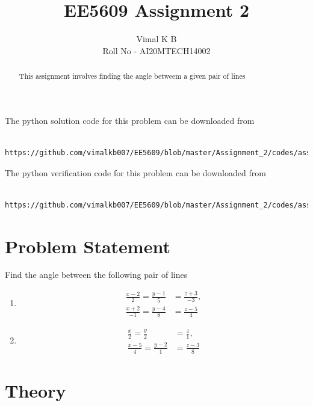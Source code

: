 \documentclass[journal,12pt,twocolumn]{IEEEtran}
\begin{document}
\title{EE5609 Assignment 2}
\author{Vimal K B \\Roll No - AI20MTECH14002}

\maketitle
\newpage
\bigskip

\renewcommand{\thefigure}{\theenumi}
\renewcommand{\thetable}{\theenumi}

\begin{abstract}
	This assignment involves finding the angle betweem a given pair of lines 
\end{abstract}

The python solution code for this problem can be downloaded from

\begin{lstlisting}
	https://github.com/vimalkb007/EE5609/blob/master/Assignment_2/codes/assignment2_solution.py
\end{lstlisting}

The python verification code for this problem can be downloaded from

\begin{lstlisting}
	https://github.com/vimalkb007/EE5609/blob/master/Assignment_2/codes/assignment2_solution_verify.py
\end{lstlisting}

\section{\textbf{Problem Statement}}
	Find the angle between the following pair of lines
	\begin{enumerate}
		\item 
		\begin{align}\label{eq1}
			\frac{x-2}{2} = \frac{y-1}{5} &= \frac{z+3}{-3}, 
			\\
			\frac{x+2}{-1} = \frac{y-4}{8} &= \frac{z-5}{4} 
		\end{align}
		\item 
		\begin{align}\label{eq2}
			\frac{x}{2} = \frac{y}{2} &= \frac{z}{1}, 
			\\
			\frac{x-5}{4} = \frac{y-2}{1} &= \frac{z-3}{8} 
		\end{align}
	\end{enumerate}
	
\section{\textbf{Theory}}
\end{document}
